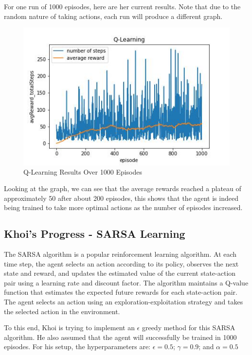 \documentclass[nohyperref]{article}
\theoremstyle{plain}
\theoremstyle{definition}
\theoremstyle{remark}
\begin{document}
For one run of 1000 episodes, here are her current results. Note that due to the random nature of taking actions, each run will produce a different graph.

\begin{figure}[H] %
    \centering
    \includegraphics[width=1\linewidth]{q-learning-average-1k.png}
    \caption{Q-Learning Results Over 1000 Episodes}
\end{figure}

Looking at the graph, we can see that the average rewards reached a plateau of approximately 50 after about 200 episodes, this shows that the agent is indeed being trained to
take more optimal actions as the number of episodes increased.

\subsection{Khoi's Progress - SARSA Learning}
The SARSA algorithm is a popular reinforcement learning algorithm. At each time step, the agent selects an action according to its policy, observes the next state and reward, and updates the estimated value of the current state-action pair using a learning rate and discount factor. 
The algorithm maintains a Q-value function that estimates the expected future rewards for each state-action pair. The agent selects an action using an exploration-exploitation strategy and takes the selected action in the environment.

To this end, Khoi is trying to implement an $\epsilon$ greedy method for this SARSA algorithm. He also assumed that the agent will successfully be trained in 1000 episodes. For his setup, the hyperparameters are: $\epsilon = 0.5$; $\gamma = 0.9$; and $\alpha = 0.5$
\end{document}
